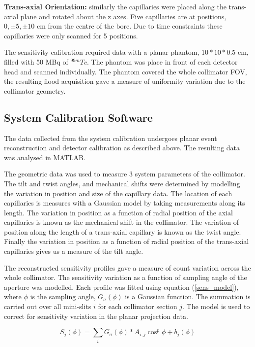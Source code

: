 \textbf{Trans-axial Orientation:} similarly the capillaries were placed along the trans-axial plane and rotated about the z axes. Five capillaries are at positions, $ 0, \pm 5, \pm 10 $ cm from the centre of the bore. Due to time constraints these capillaries were only scanned for 5 positions.

The sensitivity calibration required data with a planar phantom, $10 * 10 * 0.5$ cm, filled with 50 MBq of $^{99m}Tc$. The phantom was place in front of each detector head and scanned individually. The phantom covered the whole collimator \acrshort{FOV}, the resulting flood acquisition gave a measure of uniformity variation due to the collimator geometry. 

\subsection{System Calibration Software}
The data collected from the system calibration undergoes planar event reconstruction and detector calibration as described above. The resulting data was analysed in MATLAB.

The geometric data was used to measure 3 system parameters of the collimator. The tilt and twist angles, and mechanical shifts were determined by modelling the variation in position and size of the capillary data. The location of each capillaries is measures with a Gaussian model by taking measurements along its length. The variation in position as a function of radial position of the axial capillaries is known as the mechanical shift in the collimator. The variation of position along the length of a trans-axial capillary is known as the twist angle. Finally the variation in position as a function of radial position of the trans-axial capillaries gives us a measure of the tilt angle. 

The reconstructed sensitivity profiles gave a measure of count variation across the whole collimator. The sensitivity variation as a function of sampling angle of the aperture was modelled. Each profile was fitted using equation (\ref{sens_model}), where $\phi$ is the sampling angle, $G_{\sigma}(\phi)$ is a Gaussian function. The summation is carried out over all mini-slits $i$ for each collimator section $j$. The model is used to correct for sensitivity variation in the planar projection data. 

\begin{equation}
\label{sens_model}
S_{j}(\phi) = \sum_{i} G_{\sigma}(\phi) \ast A_{i,j} \cos^{p}{\phi} + b_{j}(\phi)
\end{equation}

